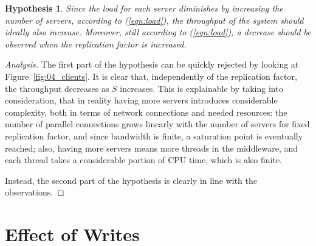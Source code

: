 \documentclass[11pt]{article}
\newcommand\task[1]{{\color[HTML]{999999}\subsection{Task}#1}}
\renewcommand\task[1]{}
\DeclarePairedDelimiter{\ceil}{\lceil}{\rceil}
\newtheorem{hyp}{Hypothesis}
\theoremstyle{definition}
\newenvironment{ana}[1][\proofname]{\begin{proof}[Analysis]}{\end{proof}}
\begin{document}
\begin{hyp}
    Since the load for each server diminishes by increasing the number of servers, according to (\ref{eqn:load}), the throughput of the system should ideally also increase.
    Moreover, still according to (\ref{eqn:load}), a decrease should be observed when the replication factor is increased.
\end{hyp}
\begin{ana}
    The first part of the hypothesis can be quickly rejected by looking at Figure~\ref{fig:04_clients}.
    It is clear that, independently of the replication factor, the throughput decreases as $S$ increases.
    This is explainable by taking into consideration, that in reality having more servers introduces considerable complexity, both in terms of network connections and needed resources: the number of parallel connections grows linearly with the number of servers for fixed replication factor, and since bandwidth is finite, a saturation point is eventually reached; also, having more servers means more threads in the middleware, and each thread takes a considerable portion of CPU time, which is also finite.
    
    Instead, the second part of the hypothesis is clearly in line with the observations.
\end{ana}

\task{
Explore how the behavior of your system changes for a 5\%-write workload with S=3,5 and 7 server backends and the following three replication factors:
\begin{itemize} 
\item Write to $1$ (no replication) 
\item Write to $\ceil{\frac{S}{2}}$ (half) 
\item Write to all 
\end{itemize}
Answer at least the following questions: Are \texttt{get} and \texttt{set} requests impacted the same way by different setups? If yes/no, why? Which operations become more expensive inside the middleware as the configuration changes? How does the scalability of your system compare to that of an ideal implementation? Provide the graphs and tables necessary to support your claims.
}

\clearpage
\section{Effect of Writes}\label{sec:writes-eff}
\end{document}
